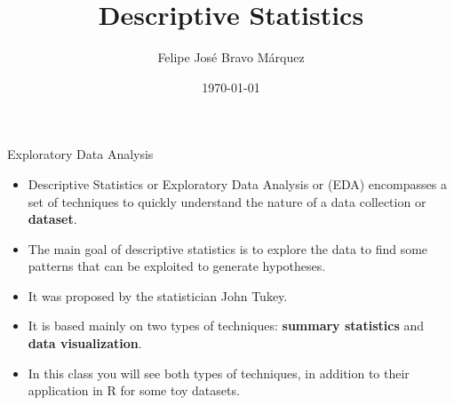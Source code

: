 \documentclass[handout]{beamer}
\title{Descriptive Statistics}
\author[Felipe Bravo Márquez]{\footnotesize
 \textcolor[rgb]{0.00,0.00,1.00}{Felipe José Bravo Márquez}}
\date{ \today }
\begin{document}
\begin{frame}
\titlepage


\end{frame}








\begin{frame}{Exploratory Data Analysis}
\scriptsize{
\begin{itemize}
 \item Descriptive Statistics or Exploratory Data Analysis or (EDA) encompasses a set of techniques to quickly understand the nature of a data collection or \textbf{dataset}.
 
 \item The main goal of descriptive statistics is to explore the data to find some patterns that can be exploited to generate hypotheses.
 
 \item It was proposed by the statistician John Tukey.
 
 \item It is based mainly on two types of techniques: \textbf{summary statistics} and \textbf{data visualization}.
 
 \item In this class you will see both types of techniques, in addition to their application in R for some toy datasets.
\end{itemize}

}

\end{frame}
\end{document}
